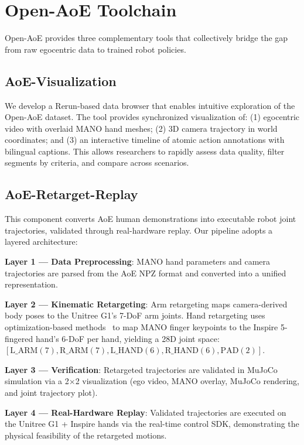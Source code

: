 \section{Open-AoE Toolchain}

Open-AoE provides three complementary tools that collectively bridge the gap from raw egocentric data to trained robot policies.

\subsection{AoE-Visualization}

We develop a Rerun-based data browser that enables intuitive exploration of the Open-AoE dataset. The tool provides synchronized visualization of: (1) egocentric video with overlaid MANO hand meshes; (2) 3D camera trajectory in world coordinates; and (3) an interactive timeline of atomic action annotations with bilingual captions. This allows researchers to rapidly assess data quality, filter segments by criteria, and compare across scenarios.

\subsection{AoE-Retarget-Replay}

This component converts AoE human demonstrations into executable robot joint trajectories, validated through real-hardware replay. Our pipeline adopts a layered architecture:

\textbf{Layer 1 --- Data Preprocessing}: MANO hand parameters and camera trajectories are parsed from the AoE NPZ format and converted into a unified representation.

\textbf{Layer 2 --- Kinematic Retargeting}: Arm retargeting maps camera-derived body poses to the Unitree G1's 7-DoF arm joints. Hand retargeting uses optimization-based methods~\cite{dexretarget} to map MANO finger keypoints to the Inspire 5-fingered hand's 6-DoF per hand, yielding a 28D joint space: $[\text{L\_ARM}(7), \text{R\_ARM}(7), \text{L\_HAND}(6), \text{R\_HAND}(6), \text{PAD}(2)]$.

\textbf{Layer 3 --- Verification}: Retargeted trajectories are validated in MuJoCo simulation via a 2$\times$2 visualization (ego video, MANO overlay, MuJoCo rendering, and joint trajectory plot).

\textbf{Layer 4 --- Real-Hardware Replay}: Validated trajectories are executed on the Unitree G1 + Inspire hands via the real-time control SDK, demonstrating the physical feasibility of the retargeted motions.


